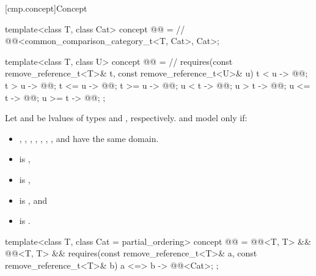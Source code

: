 [cmp.concept]{Concept }

\begin{codeblock}
template<class T, class Cat>
  concept @@ =                 // \expos
    @@<common_comparison_category_t<T, Cat>, Cat>;

template<class T, class U>
  concept @@ =      // \expos
    requires(const remove_reference_t<T>& t, const remove_reference_t<U>& u) {
      { t <  u } -> @@;
      { t >  u } -> @@;
      { t <= u } -> @@;
      { t >= u } -> @@;
      { u <  t } -> @@;
      { u >  t } -> @@;
      { u <= t } -> @@;
      { u >= t } -> @@;
    };
\end{codeblock}

\pnum
Let  and  be
lvalues of types  and
, respectively.
 and  model
 only if:
\begin{itemize}
\item
  ,
  ,
  ,
  ,
  ,
  ,
  , and
  have the same domain.
\item
   is ,
\item
   is ,
\item
   is , and
\item
   is .
\end{itemize}

%
\begin{codeblock}
template<class T, class Cat = partial_ordering>
  concept @@ =
    @@<T, T> &&
    @@<T, T> &&
    requires(const remove_reference_t<T>& a, const remove_reference_t<T>& b) {
      { a <=> b } -> @@<Cat>;
    };
\end{codeblock}

